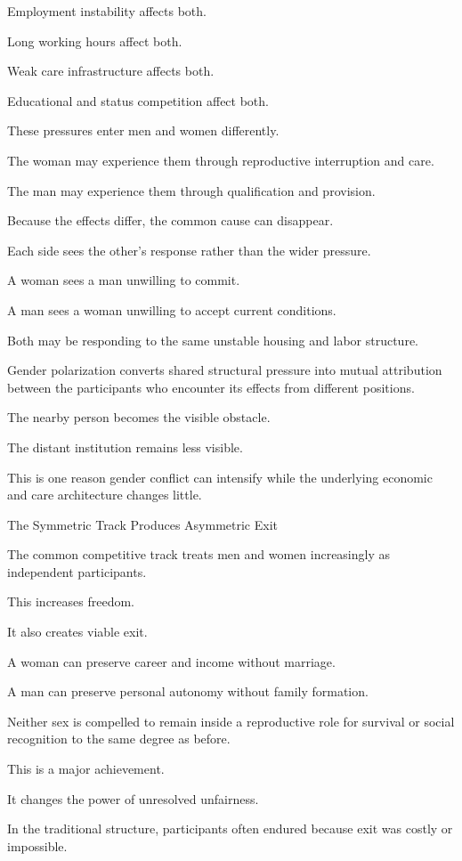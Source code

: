Employment instability affects both.

Long working hours affect both.

Weak care infrastructure affects both.

Educational and status competition affect both.

These pressures enter men and women differently.

The woman may experience them through reproductive interruption and care.

The man may experience them through qualification and provision.

Because the effects differ, the common cause can disappear.

Each side sees the other’s response rather than the wider pressure.

A woman sees a man unwilling to commit.

A man sees a woman unwilling to accept current conditions.

Both may be responding to the same unstable housing and labor structure.

Gender polarization converts shared structural pressure into mutual attribution between the participants who encounter its effects from different positions.

The nearby person becomes the visible obstacle.

The distant institution remains less visible.

This is one reason gender conflict can intensify while the underlying economic and care architecture changes little.

The Symmetric Track Produces Asymmetric Exit

The common competitive track treats men and women increasingly as independent participants.

This increases freedom.

It also creates viable exit.

A woman can preserve career and income without marriage.

A man can preserve personal autonomy without family formation.

Neither sex is compelled to remain inside a reproductive role for survival or social recognition to the same degree as before.

This is a major achievement.

It changes the power of unresolved unfairness.

In the traditional structure, participants often endured because exit was costly or impossible.

